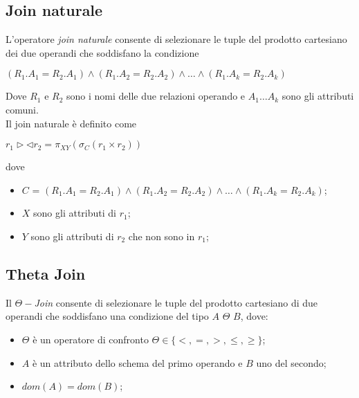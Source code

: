 \subsection{Join naturale}
L'operatore \emph{join naturale} consente di selezionare le tuple del prodotto cartesiano
dei due operandi che soddisfano la condizione
\begin{center}
\begin{math}
 (R_1.A_1 = R_2.A_1) \wedge (R_1.A_2 = R_2.A_2) \wedge \ldots \wedge (R_1.A_k = R_2.A_k)
\end{math}
\end{center}
Dove $R_1$ e $R_2$ sono i nomi delle due relazioni operando e $A_1 \ldots A_k$ sono gli 
attributi comuni.\\
Il join naturale è definito come
\begin{center}
\begin{math}
 r_1 \rhd\lhd r_2 = \pi_{XY}(\sigma_{C}(r_1 \times r_2))
\end{math}
\end{center}
dove
\begin{itemize}
 \item $C$ = $(R_1.A_1 = R_2.A_1) \wedge (R_1.A_2 = R_2.A_2) \wedge \ldots \wedge (R_1.A_k = R_2.A_k)$;
 \item $X$ sono gli attributi di $r_1$;
 \item $Y$ sono gli attributi di $r_2$ che non sono in $r_1$;
\end{itemize}

\subsection{Theta Join}
Il \emph{$\Theta-$Join} consente di selezionare le tuple del prodotto cartesiano
di due operandi che soddisfano una condizione del tipo $A$ $\Theta$ $B$, dove:
\begin{itemize}
 \item $\Theta$ è un operatore di confronto $\Theta \in \{<, =, >, \leq, \geq\}$;
 \item $A$ è un attributo dello schema del primo operando e $B$ uno del secondo;
 \item $dom(A) = dom(B)$;
\end{itemize}



